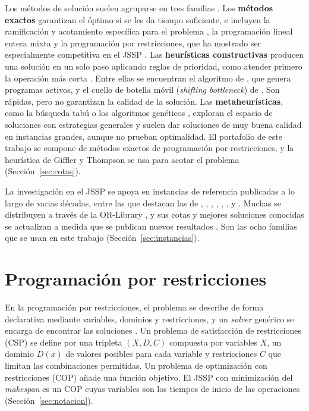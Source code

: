 Los métodos de solución suelen agruparse en tres familias
\citep{pinedo2022, strassl2022}. Los \textbf{métodos exactos} garantizan el óptimo si se
les da tiempo suficiente, e incluyen la ramificación y acotamiento específica
para el problema \citep{brucker1994}, la programación lineal entera mixta y la
programación por restricciones, que ha mostrado ser especialmente competitiva
en el JSSP \citep{ku2016}. Las \textbf{heurísticas constructivas} producen una
solución en un solo paso aplicando reglas de prioridad, como atender primero
la operación más corta \citep{panwalkar1977}. Entre ellas se encuentran el
algoritmo de \citet{giffler1960}, que genera programas activos, y el cuello de
botella móvil (\textit{shifting bottleneck}) de \citet{adams1988}. Son rápidas,
pero no garantizan la calidad de la solución. Las \textbf{metaheurísticas},
como la búsqueda tabú \citep{nowicki1996} o los algoritmos genéticos
\citep{yamada1992}, exploran el espacio de soluciones con estrategias
generales y suelen dar soluciones de muy buena calidad en instancias grandes,
aunque no prueban optimalidad. El portafolio de este trabajo se compone de
métodos exactos de programación por restricciones, y la heurística de
Giffler y Thompson se usa para acotar el problema
(Sección~\ref{sec:cotas}).

La investigación en el JSSP se apoya en instancias de referencia publicadas a
lo largo de varias décadas, entre las que destacan las de \citet{fisher1963},
\citet{lawrence1984}, \citet{adams1988}, \citet{applegate1991},
\citet{storer1992}, \citet{yamada1992}, \citet{taillard1993} y
\citet{demirkol1998}. Muchas se distribuyen a través de la OR-Library
\citep{beasley1990}, y sus cotas y mejores soluciones conocidas se actualizan
a medida que se publican nuevos resultados \citep{weise2019jssp}. Son las ocho
familias que se usan en este trabajo (Sección~\ref{sec:instancias}).

\section{Programación por restricciones}
\label{sec:cp}

En la programación por restricciones, el problema se describe de forma
declarativa mediante variables, dominios y restricciones, y un
\textit{solver} genérico se encarga de encontrar las soluciones
\citep{rossi2006}. Un problema de satisfacción de restricciones (CSP) se
define por una tripleta $(X, D, C)$ compuesta por variables $X$, un dominio
$D(x)$ de valores posibles para cada variable y restricciones $C$ que limitan
las combinaciones permitidas. Un problema de optimización con restricciones
(COP) añade una función objetivo. El JSSP con minimización del
\textit{makespan} es un COP cuyas variables son los tiempos de inicio de las
operaciones (Sección~\ref{sec:notacion}).

